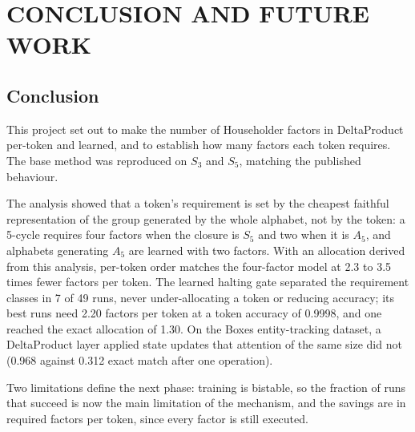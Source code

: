 \chapter{CONCLUSION AND FUTURE WORK}
\label{chap:conclusion}

\section{Conclusion}
\label{sec:conclusion}
This project set out to make the number of Householder factors in DeltaProduct per-token and learned, and to establish how many factors each token requires. The base method was reproduced on $S_3$ and $S_5$, matching the published behaviour.

The analysis showed that a token's requirement is set by the cheapest faithful representation of the group generated by the whole alphabet, not by the token: a 5-cycle requires four factors when the closure is $S_5$ and two when it is $A_5$, and alphabets generating $A_5$ are learned with two factors. With an allocation derived from this analysis, per-token order matches the four-factor model at 2.3 to 3.5 times fewer factors per token. The learned halting gate separated the requirement classes in 7 of 49 runs, never under-allocating a token or reducing accuracy; its best runs need 2.20 factors per token at a token accuracy of 0.9998, and one reached the exact allocation of 1.30. On the Boxes entity-tracking dataset, a DeltaProduct layer applied state updates that attention of the same size did not (0.968 against 0.312 exact match after one operation).

Two limitations define the next phase: training is bistable, so the fraction of runs that succeed is now the main limitation of the mechanism, and the savings are in required factors per token, since every factor is still executed.

